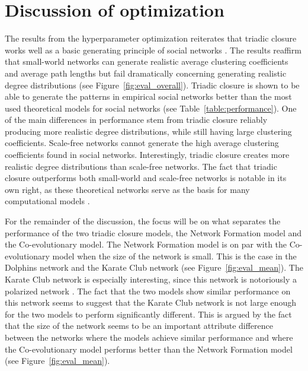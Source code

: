 \documentclass[11pt]{article}
\begin{document}
\section{Discussion of optimization}
The results from the hyperparameter optimization reiterates that triadic closure works well as a basic generating principle of social networks \cite{jackson_meeting_2007,kossinets_origins_2009,bianconi_triadic_2014}. 
The results reaffirm that small-world networks can generate realistic average clustering coefficients and average path lengths but fail dramatically concerning generating realistic degree distributions (see Figure~\ref{fig:eval_overall})\cite{jackson_meeting_2007}. Triadic closure is shown to be able to generate the patterns in empirical social networks better than the most used theoretical models for social networks (see Table~\ref{table:performance}). One of the main differences in performance stem from triadic closure reliably producing more realistic degree distributions, while still having large clustering coefficients.  Scale-free networks cannot generate the high average clustering coefficients found in social networks. Interestingly, triadic closure creates more realistic degree distributions than scale-free networks. The fact that triadic closure outperforms both small-world and scale-free networks is notable in its own right, as these theoretical networks serve as the basis for many computational models \cite{flache_models_2017, turner_paths_2018}. 

\noindent For the remainder of the discussion, the focus will be on what separates the performance of the two triadic closure models, the Network Formation model and the Co-evolutionary model. 
The Network Formation model is on par with the Co-evolutionary model when the size of the network is small. This is the case in the Dolphins network and the Karate Club network (see Figure~\ref{fig:eval_mean}). 
The Karate Club network is especially interesting, since this network is notoriously a polarized network \cite{zachary_information_1977}. 
The fact that the two models show similar performance on this network seems to suggest that the Karate Club network is not large enough for the two models to perform significantly different. 
This is argued by the fact that the size of the network seems to be an important attribute difference between the networks where the models achieve similar performance and where the Co-evolutionary model performs better than the Network Formation model (see Figure~\ref{fig:eval_mean}).
\end{document}
